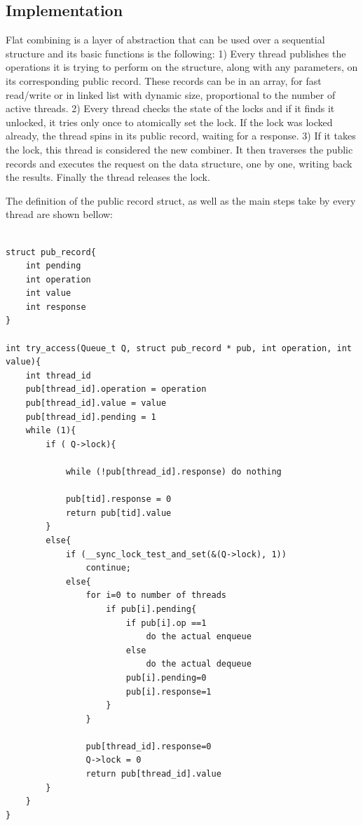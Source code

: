 \subsection{Implementation}

Flat combining is a layer of abstraction that can be used over a sequential structure and its basic functions is the following:
1) Every thread publishes the operations it is trying to perform on the structure, along with any parameters, on its corresponding public record. These records can be in an array, for fast read/write or in linked list with dynamic size, proportional to the number of active threads.
2) Every thread checks the state of the locks and if it finds it unlocked, it tries only once to atomically set the lock. If the lock was locked already, the thread spins in its public record, waiting for a response.
3) If it takes the lock, this thread is considered the new combiner. It then traverses the public records and executes the request on the data structure, one by one, writing back the results. Finally the thread releases the lock.

The definition of the public record struct, as well as the main steps take by every thread are shown bellow:

\begin{lstlisting}

struct pub_record{
	int pending
	int operation
	int value
	int response
} 

int try_access(Queue_t Q, struct pub_record * pub, int operation, int value){
	int thread_id
	pub[thread_id].operation = operation
	pub[thread_id].value = value
	pub[thread_id].pending = 1
	while (1){
		if ( Q->lock){

			while (!pub[thread_id].response) do nothing
			
			pub[tid].response = 0
			return pub[tid].value
		}
		else{
			if (__sync_lock_test_and_set(&(Q->lock), 1)) 
				continue;
			else{
				for i=0 to number of threads
					if pub[i].pending{
						if pub[i].op ==1
							do the actual enqueue
						else
							do the actual dequeue
						pub[i].pending=0
						pub[i].response=1
					}
				}
				
				pub[thread_id].response=0
				Q->lock = 0
				return pub[thread_id].value
		}
	}
}				

\end{lstlisting}

